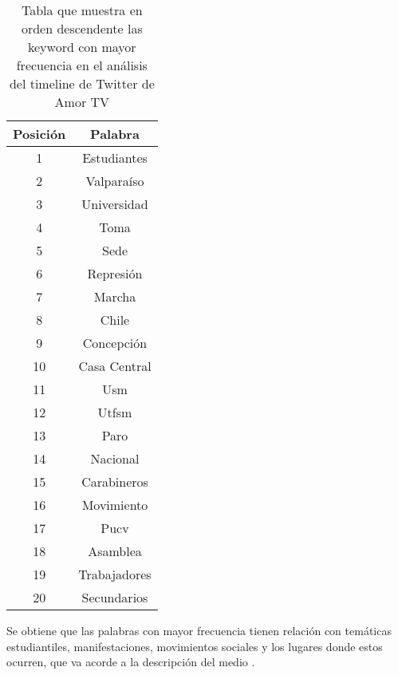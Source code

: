 \begin{table}[H]
	\begin{center}
		\begin{tabular}{| c | c |}
			\hline
			Posición & Palabra \\ \hline
			1 & Estudiantes \\ \hline
			2 & Valparaíso \\ \hline
			3 & Universidad \\ \hline
			4 & Toma \\ \hline
			5 & Sede \\ \hline
			6 & Represión \\ \hline
			7 & Marcha \\ \hline
			8 & Chile \\ \hline
			9 & Concepción \\ \hline
			10 & Casa Central \\ \hline
			11 & Usm  \\ \hline
			12 & Utfsm \\ \hline
			13 & Paro \\ \hline
			14 & Nacional \\ \hline
			15 & Carabineros \\ \hline
			16 & Movimiento \\ \hline
			17 & Pucv \\ \hline
			18 & Asamblea \\ \hline
			19 & Trabajadores \\ \hline
			20 & Secundarios \\ \hline
		\end{tabular}
		\caption{Tabla que muestra en orden descendente las keyword con mayor frecuencia
			en el análisis del timeline de Twitter de Amor TV}
		\label{tab:xyz}
	\end{center}
\end{table}

Se obtiene que las palabras con mayor frecuencia tienen relación con temáticas estudiantiles, manifestaciones, movimientos sociales y los lugares donde estos ocurren, que va acorde a la descripción del medio \cite{amorTV}.


